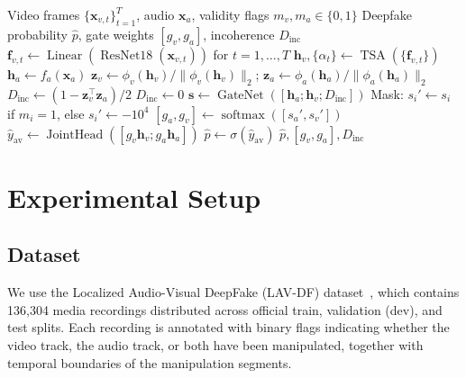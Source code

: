 \documentclass[conference]{IEEEtran}
\begin{document}
\begin{algorithm}[t]
\caption{RMS-AV Inference}
\label{alg:rmsav}
\begin{algorithmic}[1]
\REQUIRE Video frames $\{\mathbf{x}_{v,t}\}_{t=1}^T$, audio $\mathbf{x}_a$, validity flags $m_v, m_a \in \{0,1\}$
\ENSURE Deepfake probability $\hat{p}$, gate weights $[g_v, g_a]$, incoherence $D_{\mathrm{inc}}$
\STATE $\mathbf{f}_{v,t} \leftarrow \operatorname{Linear}(\operatorname{ResNet18}(\mathbf{x}_{v,t}))$ for $t = 1, \dots, T$
\STATE $\mathbf{h}_v, \{\alpha_t\} \leftarrow \operatorname{TSA}(\{\mathbf{f}_{v,t}\})$
\STATE $\mathbf{h}_a \leftarrow f_a(\mathbf{x}_a)$
    \STATE $\mathbf{z}_v \leftarrow \phi_v(\mathbf{h}_v) / \|\phi_v(\mathbf{h}_v)\|_2$; $\mathbf{z}_a \leftarrow \phi_a(\mathbf{h}_a) / \|\phi_a(\mathbf{h}_a)\|_2$
    \STATE $D_{\mathrm{inc}} \leftarrow (1 - \mathbf{z}_v^\top \mathbf{z}_a)/2$
\ELSE
    \STATE $D_{\mathrm{inc}} \leftarrow 0$
\ENDIF
\STATE $\mathbf{s} \leftarrow \operatorname{GateNet}([\mathbf{h}_a; \mathbf{h}_v; D_{\mathrm{inc}}])$
\STATE Mask: $s_i' \leftarrow s_i$ if $m_i = 1$, else $s_i' \leftarrow -10^4$
\STATE $[g_a, g_v] \leftarrow \operatorname{softmax}([s_a', s_v'])$
\STATE $\hat{y}_{\mathrm{av}} \leftarrow \operatorname{JointHead}([g_v \mathbf{h}_v; g_a \mathbf{h}_a])$
\STATE $\hat{p} \leftarrow \sigma(\hat{y}_{\mathrm{av}})$
\RETURN $\hat{p}, [g_v, g_a], D_{\mathrm{inc}}$
\end{algorithmic}
\end{algorithm}

\section{Experimental Setup}

\subsection{Dataset}

We use the Localized Audio-Visual DeepFake (LAV-DF) dataset~\cite{cai2022lavdf}, which contains 136{,}304 media recordings distributed across official train, validation (dev), and test splits. Each recording is annotated with binary flags indicating whether the video track, the audio track, or both have been manipulated, together with temporal boundaries of the manipulation segments.
\end{document}
